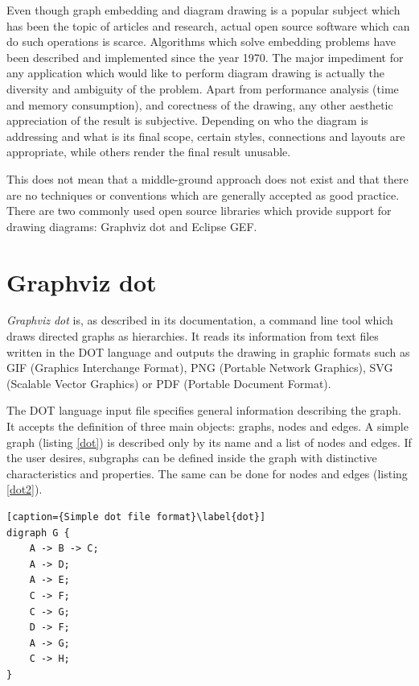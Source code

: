 Even though graph embedding and diagram drawing is a popular subject which has been the topic of articles and research, 
actual open source software which can do such operations is scarce. Algorithms which solve embedding problems have been 
described and implemented since the year 1970. The major impediment for any application which would like to perform 
diagram drawing is actually the diversity and ambiguity of the problem. Apart from performance analysis (time and 
memory consumption), and corectness of the drawing, any other aesthetic appreciation of the result is subjective.
Depending on who the diagram is addressing and what is its final scope, certain styles, connections and layouts are 
appropriate, while others render the final result unusable.

This does not mean that a middle-ground approach does not exist and that there are no techniques or conventions which are 
generally accepted as good practice. There are two commonly used open source libraries which provide support for 
drawing diagrams: \label{relwork} Graphviz dot\cite{graphvizrelwork} and Eclipse GEF\cite{eclipsegefrelwork}.

\section{Graphviz dot}

\emph{Graphviz dot} is, as described in its documentation, a command line tool which draws directed graphs as 
hierarchies. It reads its information from text files written in the DOT language and outputs the drawing in 
graphic formats such as GIF (Graphics Interchange Format), PNG (Portable Network Graphics), SVG (Scalable Vector 
Graphics) or PDF (Portable Document Format).

The DOT language input file specifies general information describing the graph. It accepts the definition of three 
main objects: graphs, nodes and edges. A simple graph (listing \ref{dot}) is described only by its name and a list of nodes and edges.
If the user desires, subgraphs can be defined inside the graph with distinctive characteristics and properties. 
The same can be done for nodes and edges (listing \ref{dot2}).

\begin{lstlisting}[caption={Simple dot file format}\label{dot}]
digraph G {
	A -> B -> C;
	A -> D;
	A -> E;
	C -> F;
	C -> G;
	D -> F;
	A -> G;
	C -> H;
}
\end{lstlisting}


